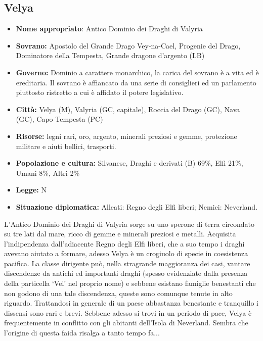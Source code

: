 \documentclass[a4paper]{report}
\begin{document}
\begin{multicols}{2}
\subsection*{Velya}
\begin{itemize}
	\item \textbf{Nome appropriato}: Antico Dominio dei Draghi di Valyria
	\item \textbf{Sovrano:} Apostolo del Grande Drago Vey-na-Cael, Progenie del Drago, Dominatore della Tempesta, Grande dragone d'argento (LB) 
	\item \textbf{Governo:} Dominio a carattere monarchico, la carica del sovrano è a vita ed è ereditaria. Il sovrano è affiancato da una serie di consiglieri ed un parlamento piuttosto ristretto a cui è affidato il potere legislativo.
	\item \textbf{Città:} Velya (M), Valyria (GC, capitale), Roccia del Drago (GC), Nava (GC), Capo Tempesta (PC)
	\item \textbf{Risorse:} legni rari, oro, argento, minerali preziosi e gemme, protezione militare e aiuti bellici, trasporti.
	\item \textbf{Popolazione e cultura:} Silvanese, Draghi e derivati (B) 69\%, Elfi 21\%, Umani 8\%, Altri 2\%
	\item \textbf{Legge:} N
	\item \textbf{Situazione diplomatica:} Alleati: Regno degli Elfi liberi; Nemici: Neverland.
\end{itemize}
L'Antico Dominio dei Draghi di Valyria sorge su uno sperone di terra circondato su tre lati dal mare, ricco di gemme e minerali preziosi e metalli. Acquisita l'indipendenza dall'adiacente Regno degli Elfi liberi, che a suo tempo i draghi avevano aiutato a formare, adesso Velya è un crogiuolo di specie in coesistenza pacifica. La classe dirigente può, nella stragrande maggioranza dei casi, vantare discendenze da antichi ed importanti draghi (spesso evidenziate dalla presenza della particella \enquote*{Vel} nel proprio nome) e sebbene esistano famiglie benestanti che non godono di una tale discendenza, queste sono comunque tenute in alto riguardo. Trattandosi in generale di un paese abbastanza benestante e tranquillo i dissensi sono rari e brevi. Sebbene adesso si trovi in un periodo di pace, Velya è frequentemente in conflitto con gli abitanti dell'Isola di Neverland. Sembra che l'origine di questa faida risalga a tanto tempo fa...


\end{multicols}
\end{document}
